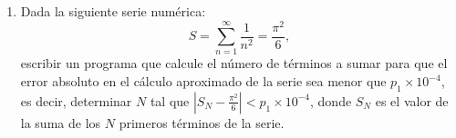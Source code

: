 \documentclass[11pt,a4paper]{article}
\begin{document}
\begin{enumerate}
\item  Dada la siguiente serie numérica:
\begin{equation*}
S = \sum_{n = 1}^\infty \frac{1}{n^2} = \frac{\pi^2}{6},
\end{equation*}
escribir un programa que calcule el número de términos a sumar para que el error absoluto en el cálculo aproximado de la serie sea menor que $p_1 \times 10^{-4}$, es decir, determinar $N$ tal que $|S_N - \frac{\pi^2}{6}| < p_1 \times 10^{-4}$, donde $S_N$ es el valor de la suma de los $N$ primeros términos de la serie.

\end{enumerate} 
\end{document}
